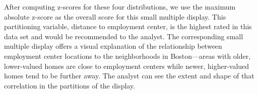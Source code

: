 After computing z-scores for these four distributions, we use the maximum absolute z-score as the overall score for this small multiple display. This partitioning variable, distance to employment center, is the highest rated in this data set and would be recommended to the analyst. The corresponding small multiple display offers a visual explanation of the relationship between employment center locations to the neighborhoods in Boston---areas with older, lower-valued homes are close to employment centers while newer, higher-valued homes tend to be further away. The analyst can see the extent and shape of that correlation in the partitions of the display.

